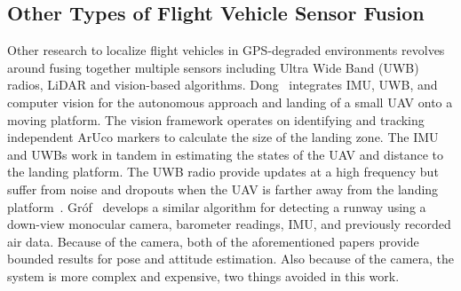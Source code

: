 \subsection{\textbf{Other Types of Flight Vehicle Sensor Fusion}}
Other research to localize flight vehicles in GPS-degraded environments revolves around fusing together multiple sensors including Ultra Wide Band (UWB) radios, LiDAR and vision-based algorithms. Dong~\cite{dongIntegratedUWBIMUVisionFramework2022} integrates IMU, UWB, and computer vision for the autonomous approach and landing of a small UAV onto a moving platform. The vision framework operates on identifying and tracking independent ArUco markers to calculate the size of the landing zone. The IMU and UWBs work in tandem in estimating the states of the UAV and distance to the landing platform. The UWB radio provide updates at a high frequency but suffer from noise and dropouts when the UAV is farther away from the landing platform~\cite{dongIntegratedUWBIMUVisionFramework2022}. Gr\'of~\cite{grofPositioningAircraftRelative2022} develops a similar algorithm for detecting a runway using a down-view monocular camera, barometer readings, IMU, and previously recorded air data. Because of the camera, both of the aforementioned papers provide bounded results for pose and attitude estimation. Also because of the camera, the system is more complex and expensive, two things avoided in this work.

